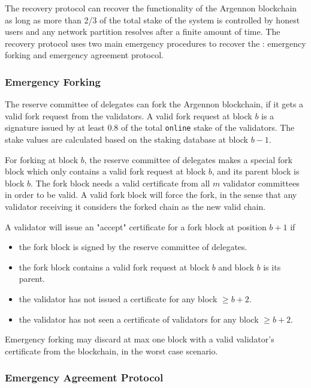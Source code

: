 The recovery protocol can recover the functionality
of the Argennon blockchain as long as more than 2/3 of the total stake of the system is controlled by honest users
and any network partition resolves after a finite amount of time. The recovery protocol uses two main emergency
procedures to recover the : emergency forking and emergency agreement protocol.

\subsubsection{Emergency Forking}

The reserve committee of delegates can fork the Argennon blockchain, if it gets a valid fork request from
the validators. A valid fork request at
block $b$ is a signature issued by at least $0.8$ of the total \texttt{online} stake
of the validators. The stake values are calculated based on the staking database at block $b - 1$.

For forking at block $b$, the reserve committee of delegates
makes a special fork block which only contains a valid fork request at block $b$, and its parent block is block $b$.
The fork block needs a valid certificate from all $m$ validator committees in order to be valid. A valid fork block
will force the fork, in the sense that any validator receiving it considers the forked chain as the new valid chain.

A validator will issue
an "accept" certificate for a fork block at position $b + 1$ if
\begin{itemize}
    \item the fork block is signed by the reserve committee of delegates.
    \item the fork block contains a valid fork request at block $b$ and block $b$ is its parent.
    \item the validator has not issued a certificate for any block $\geq b + 2$.
    \item the validator has not seen a certificate of validators for any block $\geq b + 2$.
\end{itemize}

Emergency forking may discard at max one block with a valid validator's certificate
from the blockchain, in the worst case scenario.

\subsubsection{Emergency Agreement Protocol}

